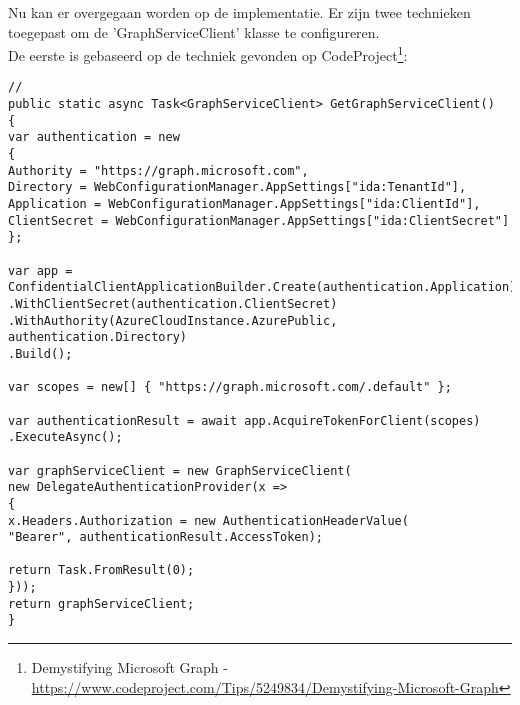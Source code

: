 Nu kan er overgegaan worden op de implementatie. Er zijn twee technieken toegepast om de 'GraphServiceClient' klasse te configureren.\\
De eerste is gebaseerd op de techniek gevonden op CodeProject\footnote{Demystifying Microsoft Graph - \url{https://www.codeproject.com/Tips/5249834/Demystifying-Microsoft-Graph}}:
\begin{lstlisting}[style=CSharpStyle]
//
public static async Task<GraphServiceClient> GetGraphServiceClient()
{
var authentication = new
{
Authority = "https://graph.microsoft.com",
Directory = WebConfigurationManager.AppSettings["ida:TenantId"],
Application = WebConfigurationManager.AppSettings["ida:ClientId"],
ClientSecret = WebConfigurationManager.AppSettings["ida:ClientSecret"]
};

var app = ConfidentialClientApplicationBuilder.Create(authentication.Application)
.WithClientSecret(authentication.ClientSecret)
.WithAuthority(AzureCloudInstance.AzurePublic, authentication.Directory)
.Build();

var scopes = new[] { "https://graph.microsoft.com/.default" };

var authenticationResult = await app.AcquireTokenForClient(scopes)
.ExecuteAsync();

var graphServiceClient = new GraphServiceClient(
new DelegateAuthenticationProvider(x =>
{
x.Headers.Authorization = new AuthenticationHeaderValue(
"Bearer", authenticationResult.AccessToken);

return Task.FromResult(0);
}));
return graphServiceClient;
}
\end{lstlisting}

